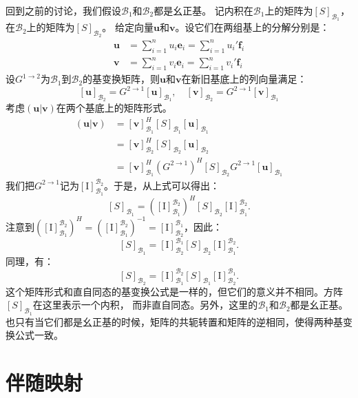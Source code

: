 \documentclass[12pt,UTF8]{ctexbook}
\begin{document}
回到之前的讨论，我们假设$\mathcal{B}_1$和$\mathcal{B}_2$都是幺正基。
记内积在$ \mathcal{B}_1$上的矩阵为$[S]_{\mathcal{B}_1}$，在$ \mathcal{B}_2$上的矩阵为$[S]_{\mathcal{B}_2} $。
给定向量$\mathbf{u}$和$\mathbf{v}$。设它们在两组基上的分解分别是：
\begin{align*}
    \mathbf{u} &= \sum_{i=1}^n u_i \mathbf{e}_i = \sum_{i=1}^n u_i' \mathbf{f}_i  \\
    \mathbf{v} &= \sum_{i=1}^n v_i \mathbf{e}_i = \sum_{i=1}^n v_i' \mathbf{f}_i  
\end{align*}
设$G^{1\rightarrow 2}$为$\mathcal{B}_1$到$\mathcal{B}_2$的基变换矩阵，则$\mathbf{u}$和$\mathbf{v}$在新旧基底上的列向量满足：
$$ [\mathbf{u}]_{\mathcal{B}_2} = G^{2\rightarrow 1} [\mathbf{u}]_{\mathcal{B}_1}, \quad [\mathbf{v}]_{\mathcal{B}_2} = G^{2\rightarrow 1} [\mathbf{v}]_{\mathcal{B}_1} $$
考虑$ ( \mathbf{u} |  \mathbf{v} )$在两个基底上的矩阵形式。
\begin{align*}
    ( \mathbf{u} |  \mathbf{v} ) &= [\mathbf{v}]_{\mathcal{B}_1}^H [S]_{\mathcal{B}_1} [\mathbf{u}]_{\mathcal{B}_1}  \\
    &= [\mathbf{v}]_{\mathcal{B}_2}^H [S]_{\mathcal{B}_2} [\mathbf{u}]_{\mathcal{B}_2}  \\
    &= [\mathbf{v}]_{\mathcal{B}_1}^H \left(G^{2 \rightarrow 1}\right)^H [S]_{\mathcal{B}_2} G^{2 \rightarrow 1} [\mathbf{u}]_{\mathcal{B}_1}  
\end{align*}
我们把$G^{2\rightarrow 1}$记为$[\mathrm{I}]_{\mathcal{B}_1}^{\mathcal{B}_2}$。于是，从上式可以得出：
$$[S]_{\mathcal{B}_1} = \left([\mathrm{I}]_{\mathcal{B}_1}^{\mathcal{B}_2}\right)^H [S]_{\mathcal{B}_2} [\mathrm{I}]_{\mathcal{B}_1}^{\mathcal{B}_2}.$$
注意到$ \left([\mathrm{I}]_{\mathcal{B}_1}^{\mathcal{B}_2}\right)^H = \left([\mathrm{I}]_{\mathcal{B}_1}^{\mathcal{B}_2}\right)^{-1} = [\mathrm{I}]_{\mathcal{B}_2}^{\mathcal{B}_1}$，因此：
$$[S]_{\mathcal{B}_1} = [\mathrm{I}]_{\mathcal{B}_2}^{\mathcal{B}_1} [S]_{\mathcal{B}_2} [\mathrm{I}]_{\mathcal{B}_1}^{\mathcal{B}_2}.$$
同理，有：
$$[S]_{\mathcal{B}_2} = [\mathrm{I}]_{\mathcal{B}_1}^{\mathcal{B}_2} [S]_{\mathcal{B}_1} [\mathrm{I}]_{\mathcal{B}_2}^{\mathcal{B}_1}.$$
这个矩阵形式和直自同态的基变换公式是一样的，但它们的意义并不相同。方阵$[S]_{\mathcal{B}_1}$在这里表示一个内积，
而非直自同态。另外，这里的$\mathcal{B}_1$和$\mathcal{B}_2$都是幺正基。
也只有当它们都是幺正基的时候，矩阵的共轭转置和矩阵的逆相同，使得两种基变换公式一致。

\section{伴随映射}
\end{document}
